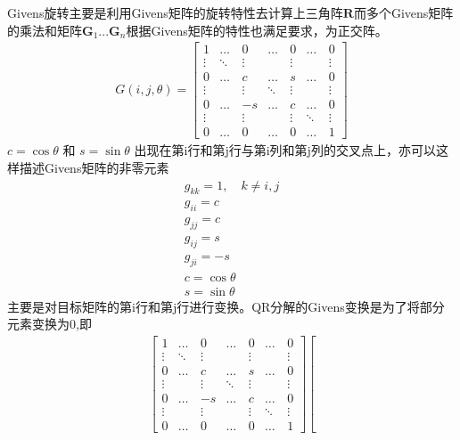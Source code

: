 \documentclass[bachelor,nocolorlinks, printoneside]{seuthesis} %
\begin{document}
\begin{Main}
Givens旋转主要是利用Givens矩阵的旋转特性去计算上三角阵$\mathbf{R}$而多个Givens矩阵的乘法和矩阵$\mathbf{G}_1...\mathbf{G}_n$根据Givens矩阵的特性也满足要求，为正交阵。
\begin{eqnarray}\label{key}
G(i,j,\theta) = \left[
\begin{array}{ccccccc}
1 & \ldots & 0 & \ldots & 0 & \ldots & 0 \\
\vdots & \ddots & \vdots & \quad & \vdots & \quad & \vdots \\
0 & \ldots & c & \ldots & s & \ldots & 0 \\
\vdots & \quad & \vdots & \ddots & \vdots & \quad & \vdots \\
0 & \ldots & -s & \ldots & c & \ldots & 0 \\
\vdots & \quad & \vdots & \quad & \vdots & \ddots & \vdots \\
0 & \ldots & 0 & \ldots & 0 & \ldots & 1 
\end{array}
\right]
\end{eqnarray}
$c=\cos\theta$ 和 $s = \sin\theta$ 出现在第i行和第j行与第i列和第j列的交叉点上，亦可以这样描述Givens矩阵的非零元素
\begin{gather}\label{key}
g_{kk} = 1 , \quad k \neq i,j  \nonumber\\ 
g_{ii} = c  \nonumber \\
g_{jj} = c  \nonumber \\
g_{ij} = s  \nonumber \\
g_{ji} = -s  \nonumber \\  
c=\cos\theta  \nonumber \\
s = \sin\theta  \nonumber
\end{gather}
主要是对目标矩阵的第i行和第j行进行变换。QR分解的Givens变换是为了将部分元素变换为0,即
\begin{eqnarray}\label{key}
\left[
\begin{array}{ccccccc}
1 & \ldots & 0 & \ldots & 0 & \ldots & 0 \\
\vdots & \ddots & \vdots & \quad & \vdots & \quad & \vdots \\
0 & \ldots & c & \ldots & s & \ldots & 0 \\
\vdots & \quad & \vdots & \ddots & \vdots & \quad & \vdots \\
0 & \ldots & -s & \ldots & c & \ldots & 0 \\
\vdots & \quad & \vdots & \quad & \vdots & \ddots & \vdots \\
0 & \ldots & 0 & \ldots & 0 & \ldots & 1 
\end{array}
\right]
\left[

\end{eqnarray}
\end{Main}
\end{document}
